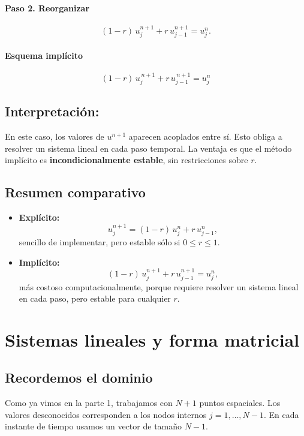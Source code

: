 \documentclass[12pt,a4paper]{article}
\begin{document}
\paragraph{Paso 2. Reorganizar}  
\[
(1-r)\,u_j^{n+1} + r\,u_{j-1}^{n+1} = u_j^n.
\]

\paragraph{Esquema implícito}  
\[
\boxed{(1-r)\,u_j^{\,n+1} + r\,u_{j-1}^{\,n+1} = u_j^n}
\]

\subsection*{Interpretación:}
En este caso, los valores de $u^{n+1}$ aparecen acoplados entre sí.  
Esto obliga a resolver un sistema lineal en cada paso temporal.  
La ventaja es que el método implícito es \textbf{incondicionalmente estable}, sin restricciones sobre $r$.

\subsection{Resumen comparativo}

\begin{itemize}
    \item \textbf{Explícito:}  
    \[
    u_j^{n+1} = (1-r)\,u_j^n + r\,u_{j-1}^n,
    \]
    sencillo de implementar, pero estable sólo si $0 \leq r \leq 1$.

    \item \textbf{Implícito:}  
    \[
    (1-r)\,u_j^{n+1} + r\,u_{j-1}^{n+1} = u_j^n,
    \]
    más costoso computacionalmente, porque requiere resolver un sistema lineal en cada paso, pero estable para cualquier $r$.
\end{itemize}

\section{Sistemas lineales y forma matricial}

\subsection{Recordemos el dominio}
Como ya vimos en la parte 1, trabajamos con $N+1$ puntos espaciales.  
Los valores desconocidos corresponden a los nodos internos $j=1,\dots,N-1$. En cada instante de tiempo usamos un vector de tamaño $N-1$.
\end{document}
